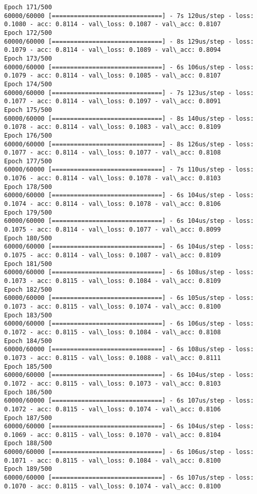 \documentclass[11pt]{article}
\begin{document}
\begin{Verbatim}[commandchars=\\\{\}]
Epoch 171/500
60000/60000 [==============================] - 7s 120us/step - loss: 0.1080 - acc: 0.8114 - val\_loss: 0.1087 - val\_acc: 0.8107
Epoch 172/500
60000/60000 [==============================] - 8s 129us/step - loss: 0.1079 - acc: 0.8114 - val\_loss: 0.1089 - val\_acc: 0.8094
Epoch 173/500
60000/60000 [==============================] - 6s 106us/step - loss: 0.1079 - acc: 0.8114 - val\_loss: 0.1085 - val\_acc: 0.8107
Epoch 174/500
60000/60000 [==============================] - 7s 123us/step - loss: 0.1077 - acc: 0.8114 - val\_loss: 0.1097 - val\_acc: 0.8091
Epoch 175/500
60000/60000 [==============================] - 8s 140us/step - loss: 0.1078 - acc: 0.8114 - val\_loss: 0.1083 - val\_acc: 0.8109
Epoch 176/500
60000/60000 [==============================] - 8s 126us/step - loss: 0.1077 - acc: 0.8114 - val\_loss: 0.1077 - val\_acc: 0.8108
Epoch 177/500
60000/60000 [==============================] - 7s 110us/step - loss: 0.1076 - acc: 0.8114 - val\_loss: 0.1078 - val\_acc: 0.8103
Epoch 178/500
60000/60000 [==============================] - 6s 104us/step - loss: 0.1074 - acc: 0.8114 - val\_loss: 0.1078 - val\_acc: 0.8106
Epoch 179/500
60000/60000 [==============================] - 6s 104us/step - loss: 0.1075 - acc: 0.8114 - val\_loss: 0.1077 - val\_acc: 0.8099
Epoch 180/500
60000/60000 [==============================] - 6s 104us/step - loss: 0.1075 - acc: 0.8114 - val\_loss: 0.1087 - val\_acc: 0.8109
Epoch 181/500
60000/60000 [==============================] - 6s 108us/step - loss: 0.1073 - acc: 0.8115 - val\_loss: 0.1084 - val\_acc: 0.8109
Epoch 182/500
60000/60000 [==============================] - 6s 105us/step - loss: 0.1073 - acc: 0.8115 - val\_loss: 0.1074 - val\_acc: 0.8100
Epoch 183/500
60000/60000 [==============================] - 6s 106us/step - loss: 0.1072 - acc: 0.8115 - val\_loss: 0.1084 - val\_acc: 0.8108
Epoch 184/500
60000/60000 [==============================] - 6s 108us/step - loss: 0.1073 - acc: 0.8115 - val\_loss: 0.1088 - val\_acc: 0.8111
Epoch 185/500
60000/60000 [==============================] - 6s 104us/step - loss: 0.1072 - acc: 0.8115 - val\_loss: 0.1073 - val\_acc: 0.8103
Epoch 186/500
60000/60000 [==============================] - 6s 107us/step - loss: 0.1072 - acc: 0.8115 - val\_loss: 0.1074 - val\_acc: 0.8106
Epoch 187/500
60000/60000 [==============================] - 6s 104us/step - loss: 0.1069 - acc: 0.8115 - val\_loss: 0.1070 - val\_acc: 0.8104
Epoch 188/500
60000/60000 [==============================] - 6s 106us/step - loss: 0.1071 - acc: 0.8115 - val\_loss: 0.1084 - val\_acc: 0.8100
Epoch 189/500
60000/60000 [==============================] - 6s 107us/step - loss: 0.1070 - acc: 0.8115 - val\_loss: 0.1074 - val\_acc: 0.8100

\end{Verbatim}
\end{document}
